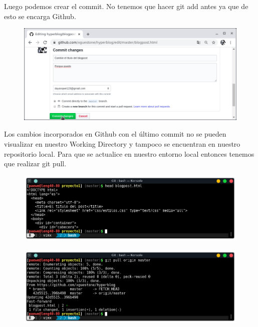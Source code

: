 \documentclass{article}
\begin{document}
Luego podemos crear el commit. No tenemos que hacer git add antes ya que de
esto se encarga Github.

\newpage

\begin{figure}[h!]
  \centering
  \includegraphics[scale=0.75]{./Pictures/204_github_commit.png}
\end{figure}

Los cambios incorporados en Github con el último commit no se pueden visualizar
en nuestro Working Directory y tampoco se encuentran en nuestro repositorio
local. Para que se actualice en nuestro entorno local entonces tenemos que
realizar git pull.

\begin{figure}[h!]
  \centering
  \includegraphics[scale=0.75]{./Pictures/205_local_repository.png}
\end{figure}

\begin{figure}[h!]
  \centering
  \includegraphics[scale=0.75]{./Pictures/206_pull_origin_master.png}
\end{figure}
\end{document}
